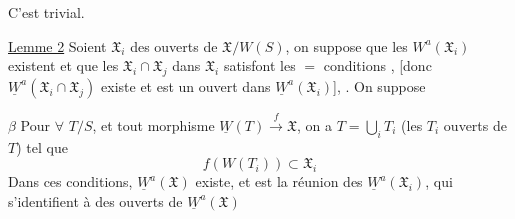 C'est trivial.


\uline{Lemme 2} Soient $\mathfrak X_i$ des ouverts de $\mathfrak X/W(S)$, on suppose  que  les $W^a(\mathfrak X_i)$ existent  \deleted{)} et que les $\mathfrak X_i\cap\mathfrak X_j$ dans $\mathfrak X_i$ satisfont les $=$ conditions , [donc $\underline W^a(\mathfrak X_i\cap\mathfrak X_j)$ existe\unsure{\}} et est un ouvert dans $\underline W^a(\mathfrak X_i)$], . On suppose

\textcircled{$\beta$} Pour $\forall$ $T/S$, et tout morphisme $\underline W(T)\xrightarrow{f}\mathfrak X$, on a $T=\bigcup_i T_i$ (les $T_i$ ouverts de $T$) tel que
\[
f(W(T_i))\subset\mathfrak X_i
\]
Dans ces conditions, $\underline W^a(\mathfrak X)$ existe, et est la réunion des $\underline W^a(\mathfrak X_i)$, qui s'identifient à des ouverts de $\underline W^a(\mathfrak X)$
